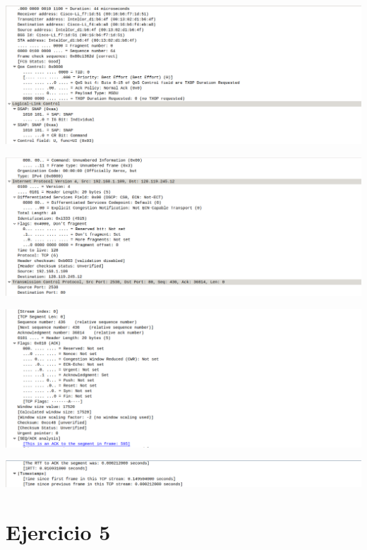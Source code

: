 \documentclass{article}
\begin{document}
\begin{center}
\includegraphics[scale=0.3]{WLAN/tcpreq5.png}
\end{center}
\begin{center}
\includegraphics[scale=0.3]{WLAN/tcpreq6.png}
\end{center}
\begin{center}
\includegraphics[scale=0.3]{WLAN/tcpreq7.png}
\end{center}
\begin{center}
\includegraphics[scale=0.3]{WLAN/tcpreq8.png}
\end{center}

\section{Ejercicio 5}
\end{document}

